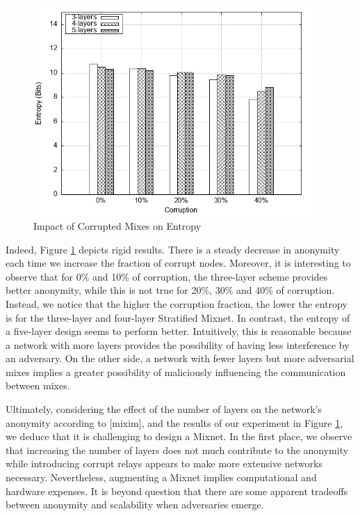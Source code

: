 \documentclass[logo,msc,cyber]{infthesis}   %
\begin{document}
\begin{figure}[h!]
    \centering
    \includegraphics[height=8cm]{figures/mixim/4.png}
    \caption{Impact of Corrupted Mixes on Entropy}
    \label{fig:corrupted-mixes}
 \end{figure}

Indeed, Figure \ref{fig:corrupted-mixes} depicts rigid results. There is a
steady decrease in anonymity each time we increase the fraction of corrupt
nodes. Moreover, it is interesting to observe that for 0\% and 10\% of
corruption, the three-layer scheme provides better anonymity, while this is not
true for 20\%, 30\% and 40\% of corruption. Instead, we notice that the higher
the corruption fraction, the lower the entropy is for the three-layer and
four-layer Stratified Mixnet. In contrast, the entropy of a five-layer design
seems to perform better. Intuitively, this is reasonable because a network with
more layers provides the possibility of having less interference by an
adversary. On the other side, a network with fewer layers but more adversarial
mixes implies a greater possibility of maliciously influencing the communication
between mixes.

Ultimately, considering the effect of the number of layers on the network's
anonymity according to [mixim], and the results of our experiment in Figure
\ref{fig:corrupted-mixes}, we deduce that it is challenging to design a Mixnet.
In the first place, we observe that increasing the number of layers does not
much contribute to the anonymity while introducing corrupt relays appears to
make more extensive networks necessary. Nevertheless, augmenting a Mixnet
implies computational and hardware expenses. It is beyond question that there
are some apparent tradeoffs between anonymity and scalability when adversaries
emerge.
\end{document}
